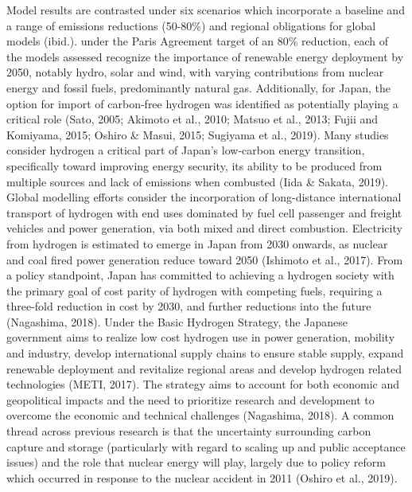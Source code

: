 Model results are contrasted under six scenarios which incorporate a baseline and a range of emissions reductions (50-80\%) and regional obligations for global models (ibid.). under the Paris Agreement target of an 80\% reduction, each of the models assessed recognize the importance of renewable energy deployment by 2050, notably hydro, solar and wind, with varying contributions from nuclear energy and fossil fuels, predominantly natural gas. Additionally, for Japan, the option for import of carbon-free hydrogen was identified as potentially playing a critical role (Sato, 2005; Akimoto et al., 2010; Matsuo et al., 2013; Fujii and Komiyama, 2015; Oshiro & Masui, 2015; Sugiyama et al., 2019). Many studies consider hydrogen a critical part of Japan’s low-carbon energy transition, specifically toward improving energy security, its ability to be produced from multiple sources and lack of emissions when combusted (Iida & Sakata, 2019). Global modelling efforts consider the incorporation of long-distance international transport of hydrogen with end uses dominated by fuel cell passenger and freight vehicles and power generation, via both mixed and direct combustion. Electricity from hydrogen is estimated to emerge in Japan from 2030 onwards, as nuclear and coal fired power generation reduce toward 2050 (Ishimoto et al., 2017). From a policy standpoint, Japan has committed to achieving a hydrogen society with the primary goal of cost parity of hydrogen with competing fuels, requiring a three-fold reduction in cost by 2030, and further reductions into the future (Nagashima, 2018). Under the Basic Hydrogen Strategy, the Japanese government aims to realize low cost hydrogen use in power generation, mobility and industry, develop international supply chains to ensure stable supply, expand renewable deployment and revitalize regional areas and develop hydrogen related technologies (METI, 2017). The strategy aims to account for both economic and geopolitical impacts and the need to prioritize research and development to overcome the economic and technical challenges (Nagashima, 2018). A common thread across previous research is that the uncertainty surrounding carbon capture and storage (particularly with regard to scaling up and public acceptance issues) and the role that nuclear energy will play, largely due to policy reform which occurred in response to the nuclear accident in 2011 (Oshiro et al., 2019).

